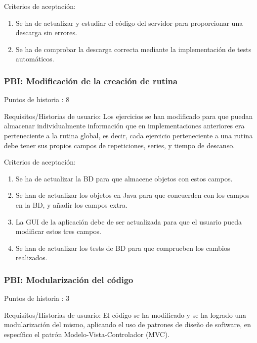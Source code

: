 \documentclass[11pt,a4paper]{report}
\begin{document}
Criterios de aceptación:
\begin{enumerate}
	\item Se ha de actualizar y estudiar el código del servidor para proporcionar una descarga sin errores.
	
	\item Se ha de comprobar la descarga correcta mediante la implementación de tests automáticos.
	
\end{enumerate}
\subsubsection{PBI: Modificación de la creación de rutina}
Puntos de historia : 8

Requisitos/Historias de usuario: Los ejercicios se han modificado para que puedan almacenar  individualmente información que en implementaciones anteriores era perteneciente a la rutina global, es decir, cada ejercicio perteneciente a una rutina debe tener sus propios campos de repeticiones, series, y tiempo de descanso.

Criterios de aceptación:
\begin{enumerate}
	\item Se ha de actualizar la BD para que almacene objetos con estos campos.
	
	\item Se han de actualizar los objetos en Java para que concuerden con los campos en la BD, y añadir los campos extra.
	
	\item La GUI de la aplicación debe de ser actualizada para que el usuario pueda modificar estos tres campos.
	
	\item Se han de actualizar los tests de BD para que comprueben los cambios realizados.
	
\end{enumerate}
\subsubsection{PBI: Modularización del código}
Puntos de historia : 3

Requisitos/Historias de usuario: El código se ha modificado y se ha logrado una modularización del mismo, aplicando el uso de patrones de diseño de software, en específico el patrón Modelo-Vista-Controlador (MVC).
\end{document}
